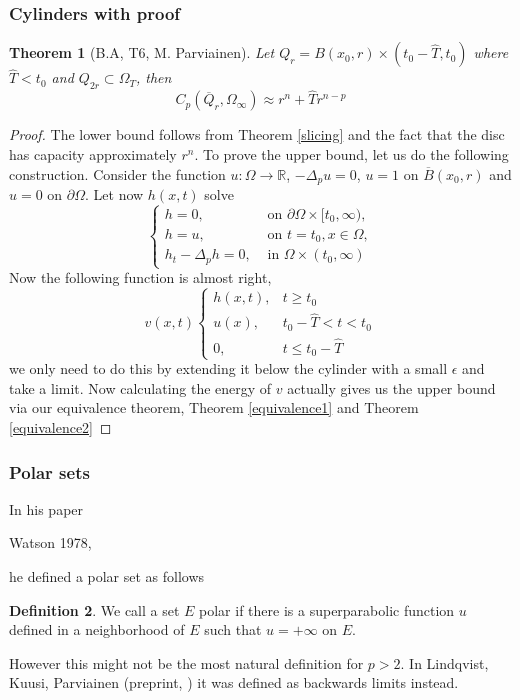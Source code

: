 \documentclass[reqno,a4paper,12pt]{amsart}
\newtheorem{theorem}{Theorem}[section]
\theoremstyle{definition}
\newtheorem{definition}[theorem]{Definition}
\numberwithin{theorem}{section} \numberwithin{equation}{section}
\newcommand{\R}{{\mathbb R}}
\begin{document}
\subsubsection{Cylinders with proof}
\begin{theorem}[B.A, T6, M. Parviainen]
	Let $Q_r = B(x_0,r) \times (t_0-\hat T, t_0)$ where $\hat T < t_0$ and $Q_{2r} \subset \Omega_T$, then
	\begin{equation} \nonumber \label{}
		C_p(\overline Q_r,\Omega_\infty) \approx r^n + \hat T r^{n-p}
	\end{equation}
\end{theorem}
\begin{proof}
	The lower bound follows from Theorem \ref{slicing} and the fact that the disc has capacity approximately $r^n$. To prove the upper bound, let us do the following construction. Consider the function $u: \Omega \to \R$, $-\Delta_p u = 0$, $u = 1$ on $\overline B(x_0,r)$ and $u = 0$ on $\partial \Omega$. Let now $h(x,t)$ solve
	\begin{equation} \nonumber \label{}
		\begin{cases}
			h=0, & \text{ on } \partial \Omega \times [t_0,\infty), \\
			h=u, & \text{ on } t=t_0, x \in \Omega, \\
			h_t - \Delta_p h = 0, & \text{ in } \Omega \times (t_0,\infty)
		\end{cases}
	\end{equation}
	Now the following function is almost right,
	\begin{equation} \nonumber \label{}
		v(x,t)
		\begin{cases}
			h(x,t), & t \geq t_0 \\
			u(x), & t_0 - \hat T < t < t_0 \\
			0, & t \leq t_0 - \hat T
		\end{cases}
	\end{equation}
	we only need to do this by extending it below the cylinder with a small $\epsilon$ and take a limit. Now calculating the energy of $v$ actually gives us the upper bound via our equivalence theorem, Theorem \ref{equivalence1} and Theorem \ref{equivalence2}
\end{proof}
\subsubsection{Polar sets}
In his paper

Watson 1978, \cite{W}

he defined a polar set as follows
\begin{definition}
	We call a set $E$ polar if there is a superparabolic function $u$ defined in a neighborhood of $E$ such that $u = +\infty$ on $E$.
\end{definition}
However this might not be the most natural definition for $p > 2$.
In Lindqvist, Kuusi, Parviainen (preprint, \cite{LKP}) it was defined as backwards limits instead.
\end{document}
